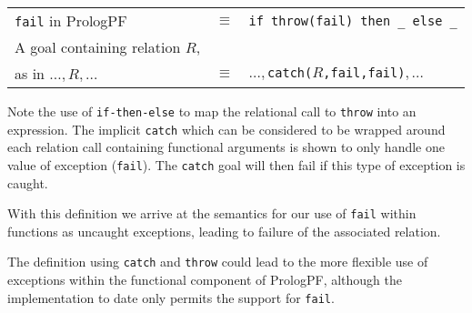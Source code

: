 \begin{tabular}{l l l}
\texttt{fail} in PrologPF       &$\equiv$ &\texttt{if throw(fail) then \_{} else \_{}}\\[4mm]
A goal containing relation $R$, &         &\\
as in $\ldots,R,\ldots$         &$\equiv$ &$\ldots,$\texttt{catch(}$R$\texttt{,fail,fail)}$,\ldots$\\
\end{tabular}

Note the use of \texttt{if-then-else} to map the relational call to
\texttt{throw} into an expression.  The implicit \texttt{catch} which can
be considered to be wrapped around each relation call containing functional
arguments is shown to only handle one value of exception (\texttt{fail}).
The \texttt{catch} goal will then fail if this type of exception is
caught.

With this definition we arrive at the semantics for our use of
\texttt{fail} within functions as uncaught exceptions, leading to
failure of the associated relation.

The definition using \texttt{catch} and \texttt{throw}
could lead to the more flexible use of exceptions within
the functional component of PrologPF,  although the implementation to
date only permits the support for \texttt{fail}.

